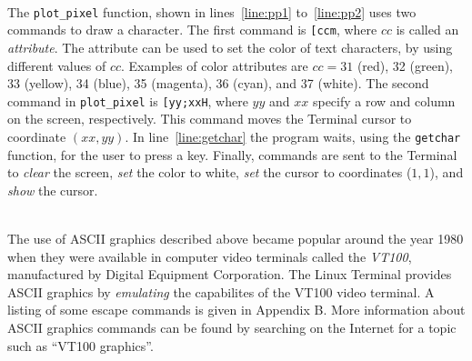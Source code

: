 \documentclass[epsfig,10pt,fullpage]{article}
\begin{document}
~\\
\noindent The \texttt{plot\_pixel} function, shown in lines~\ref{line:pp1} to~\ref{line:pp2} uses 
two commands to draw a character. The first command is \texttt{[ccm}, where $cc$ is
called an {\it attribute}. The attribute can be used to set the color of text characters,
by using different values of $cc$. Examples of color attributes are $cc = 31$ (red), 
32 (green), 33 (yellow), 34 (blue), 35 (magenta), 36 (cyan), and 37 (white). The second command 
in \texttt{plot\_pixel} is \texttt{[yy;xxH}, where $yy$ and $xx$ specify a row and
column on the screen, respectively. This command moves the Terminal cursor to coordinate
$(xx, yy)$. In line~\ref{line:getchar} the program waits, using the \texttt{getchar}
function, for the user to press a key. Finally, commands are sent to the Terminal to {\it clear} 
the screen, {\it set} the color to white, {\it set} the cursor to coordinates ($1, 1$), and
{\it show} the cursor.

~\\
\noindent 
The use of ASCII graphics described above became popular around the year 1980 when they
were available in computer video terminals called the {\it VT100}, manufactured by Digital 
Equipment Corporation. The Linux Terminal provides ASCII graphics by {\it emulating} the 
capabilites of the VT100 video terminal. A listing of some escape commands is given in 
Appendix B. More information about ASCII graphics 
commands can be found by searching on the Internet for a topic such as ``VT100 graphics''.
\end{document}

